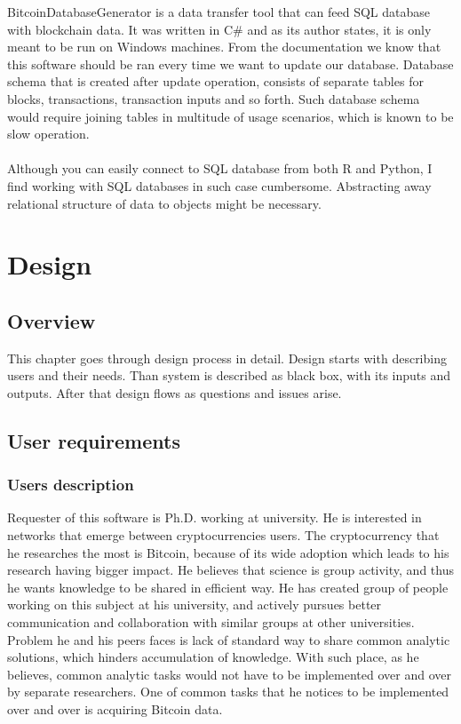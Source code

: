 \documentclass[12pt, en, eng, oneside]{mgr}
\begin{document}
BitcoinDatabaseGenerator is a data transfer tool that can feed SQL database with blockchain data. It was written in C\# and as its author states, it is only meant to be run on Windows machines. From the documentation we know that this software should be ran every time we want to update our database. Database schema that is created after update operation, consists of separate tables for blocks, transactions, transaction inputs and so forth. Such database schema would require joining tables in multitude of usage scenarios, which is known to be slow operation.
\\
\\
Although you can easily connect to SQL database from both R and Python, I find working with SQL databases in such case cumbersome. Abstracting away relational structure of data to objects might be necessary. 


\chapter{Design}

\section{Overview}
This chapter goes through design process in detail. Design starts with describing users and their needs. Than system is described as black box, with its inputs and outputs. After that design flows as questions and issues arise. 

\section{User requirements}

\subsection{Users description}

Requester of this software is Ph.D. working at university. He is interested in networks that emerge between cryptocurrencies users. The cryptocurrency that he researches the most is Bitcoin, because of its wide adoption which leads to his research having bigger impact. He believes that science is group activity, and thus he wants knowledge to be shared in efficient way. He has created group of people working on this subject at his university, and actively pursues better communication and collaboration with similar groups at other universities. Problem he and his peers faces is lack of standard way to share common analytic solutions, which hinders accumulation of knowledge. With such place, as he believes, common analytic tasks would not have to be implemented over and over by separate researchers. One of common tasks that he notices to be implemented over and over is acquiring Bitcoin data.  
\end{document}
